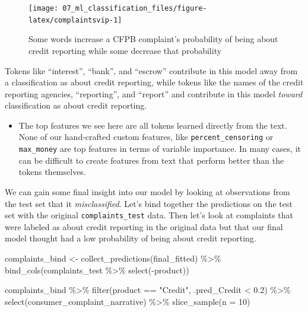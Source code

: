 \documentclass[
]{krantz}
\makeatletter
\newenvironment{Shaded}{\begin{snugshade}}{\end{snugshade}}
\newcommand{\AttributeTok}[1]{\textcolor[rgb]{0.77,0.63,0.00}{#1}}
\newcommand{\DecValTok}[1]{\textcolor[rgb]{0.00,0.00,0.81}{#1}}
\newcommand{\FloatTok}[1]{\textcolor[rgb]{0.00,0.00,0.81}{#1}}
\newcommand{\FunctionTok}[1]{\textcolor[rgb]{0.00,0.00,0.00}{#1}}
\newcommand{\NormalTok}[1]{#1}
\newcommand{\OtherTok}[1]{\textcolor[rgb]{0.56,0.35,0.01}{#1}}
\newcommand{\SpecialCharTok}[1]{\textcolor[rgb]{0.00,0.00,0.00}{#1}}
\newcommand{\StringTok}[1]{\textcolor[rgb]{0.31,0.60,0.02}{#1}}
\newenvironment{kframe}{%
\medskip{}
\setlength{\fboxsep}{.8em}
 \def\at@end@of@kframe{}%
 \ifinner\ifhmode%
  \def\at@end@of@kframe{\end{minipage}}%
  \begin{minipage}{\columnwidth}%
 \fi\fi%
 \def\FrameCommand##1{\hskip\@totalleftmargin \hskip-\fboxsep
 \colorbox{shadecolor}{##1}\hskip-\fboxsep
     \hskip-\linewidth \hskip-\@totalleftmargin \hskip\columnwidth}%
 \MakeFramed {\advance\hsize-\width
   \@totalleftmargin\z@ \linewidth\hsize
   \@setminipage}}%
 {\par\unskip\endMakeFramed%
 \at@end@of@kframe}
\renewenvironment{Shaded}{\begin{kframe}}{\end{kframe}}
\newenvironment{rmdblock}[1]
  {\begin{shaded*}
  \begin{itemize}[left = -1cm, labelsep = 1cm]
  \renewcommand{\labelitemi}{
    \raisebox{-.7\height}[0pt][0pt]{
      {\setkeys{Gin}{width=3em,keepaspectratio}\texttt{[image: images/\#1]}}
    }
  }
 
  \item
  }
  {
  \end{itemize}
  \end{shaded*}
  }
\newenvironment{rmdnote}
  {\begin{rmdblock}{note}}
  {\end{rmdblock}}
\makeatother
\begin{document}
\begin{figure}

{\centering \texttt{[image: 07\_ml\_classification\_files/figure-latex/complaintsvip-1]} 

}

\caption{Some words increase a CFPB complaint's probability of being about credit reporting while some decrease that probability}\label{fig:complaintsvip}
\end{figure}

Tokens like ``interest'', ``bank'', and ``escrow'' contribute in this model away from a classification as about credit reporting, while tokens like the names of the credit reporting agencies, ``reporting'', and ``report'' and contribute in this model \emph{toward} classification as about credit reporting.

\begin{rmdnote}
The top features we see here are all tokens learned directly from the
text. None of our hand-crafted custom features, like
\texttt{percent\_censoring} or \texttt{max\_money} are top features in
terms of variable importance. In many cases, it can be difficult to
create features from text that perform better than the tokens
themselves.
\end{rmdnote}

We can gain some final insight into our model by looking at observations from the test set that it \emph{misclassified}. Let's bind together the predictions on the test set with the original \texttt{complaints\_test} data. Then let's look at complaints that were labeled as about credit reporting in the original data but that our final model thought had a low probability of being about credit reporting.

\begin{Shaded}
\begin{Highlighting}[]
\NormalTok{complaints\_bind }\OtherTok{\textless{}{-}} \FunctionTok{collect\_predictions}\NormalTok{(final\_fitted) }\SpecialCharTok{\%\textgreater{}\%}
  \FunctionTok{bind\_cols}\NormalTok{(complaints\_test }\SpecialCharTok{\%\textgreater{}\%} \FunctionTok{select}\NormalTok{(}\SpecialCharTok{{-}}\NormalTok{product))}

\NormalTok{complaints\_bind }\SpecialCharTok{\%\textgreater{}\%}
  \FunctionTok{filter}\NormalTok{(product }\SpecialCharTok{==} \StringTok{"Credit"}\NormalTok{, .pred\_Credit }\SpecialCharTok{\textless{}} \FloatTok{0.2}\NormalTok{) }\SpecialCharTok{\%\textgreater{}\%}
  \FunctionTok{select}\NormalTok{(consumer\_complaint\_narrative) }\SpecialCharTok{\%\textgreater{}\%}
  \FunctionTok{slice\_sample}\NormalTok{(}\AttributeTok{n =} \DecValTok{10}\NormalTok{)}
\end{Highlighting}
\end{Shaded}
\end{document}
